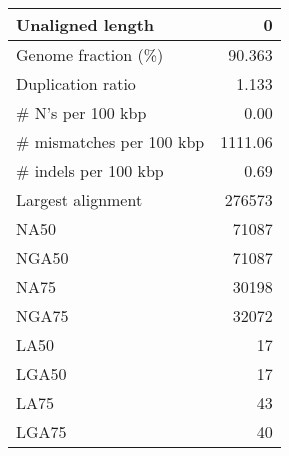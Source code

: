 \documentclass[12pt,a4paper]{article}
\begin{document}
\begin{table}[ht]
\begin{center}
\begin{tabular}{|l*{1}{|r}|}
Unaligned length & 0 \\ \hline
Genome fraction (\%) & 90.363 \\ \hline
Duplication ratio & 1.133 \\ \hline
\# N's per 100 kbp & 0.00 \\ \hline
\# mismatches per 100 kbp & 1111.06 \\ \hline
\# indels per 100 kbp & 0.69 \\ \hline
Largest alignment & 276573 \\ \hline
NA50 & 71087 \\ \hline
NGA50 & 71087 \\ \hline
NA75 & 30198 \\ \hline
NGA75 & 32072 \\ \hline
LA50 & 17 \\ \hline
LGA50 & 17 \\ \hline
LA75 & 43 \\ \hline
LGA75 & 40 \\ \hline
\end{tabular}
\end{center}
\end{table}
\end{document}
